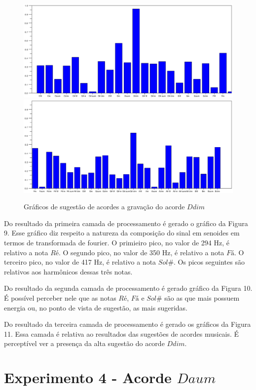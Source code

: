 \begin{figure}[h]
	\centering
		\includegraphics[keepaspectratio=true,scale=0.49]{figuras/Dm/acordes_1_Ddim.eps}
		\includegraphics[keepaspectratio=true,scale=0.49]{figuras/Dm/acordes_2_Ddim.eps}
	\caption{Gráficos de sugestão de acordes a gravação do acorde $Ddim$}
\end{figure}
\newpage

Do resultado da primeira camada de processamento é gerado o gráfico da Figura 9. Esse gráfico diz respeito a natureza da composição do sinal em senoides em termos de transformada de fourier. O primieiro pico, no valor de 294 Hz, é relativo a nota $Ré$. O segundo pico, no valor de 350 Hz, é relativo a nota $Fá$. O terceiro pico, no valor de 417 Hz, é relativo a nota $Sol\#$. Os picos seguintes são relativos aos harmônicos dessas três notas. 

Do resultado da segunda camada de processamento é gerado gráfico da Figura 10. É possível perceber nele que as notas $Ré$, $Fá$ e $Sol\#$ são as que mais possuem energia ou, no ponto de vista de sugestão, as mais sugeridas.

Do resultado da terceira camada de processamento é gerado os gráficos da Figura 11. Essa camada é relativa ao resultados das sugestões de acordes musicais. É perceptível ver a presença da alta sugestão do acorde $Ddim$.

\section{Experimento 4 - Acorde $Daum$}
\label{sec:experimento4}

